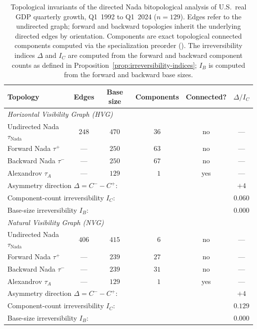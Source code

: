 \documentclass[11pt,a4paper]{article}
\theoremstyle{plain}
\theoremstyle{definition}
\newcommand{\taufwd}{\tau^{+}}
\newcommand{\taubwd}{\tau^{-}}
\begin{document}
\begin{table}[h]
\centering
\small
\begin{tabular}{l c c c c c}
\hline
\textbf{Topology} & \textbf{Edges} & \textbf{Base size} &
  \textbf{Components} & \textbf{Connected?} & $\Delta / I_{C}$ \\
\hline
\multicolumn{6}{l}{\emph{Horizontal Visibility Graph (HVG)}} \\
Undirected Nada $\tau_{\text{Nada}}$ & $248$ & $470$ & $36$ & no & --- \\
Forward Nada $\taufwd$               & ---  & $250$ & $63$ & no & --- \\
Backward Nada $\taubwd$              & ---  & $250$ & $67$ & no & --- \\
Alexandrov $\tau_A$                  & ---  & $129$ & $\phantom{0}1$ & yes & --- \\[0.4ex]
\multicolumn{5}{l}{\hspace{1em}Asymmetry direction $\Delta = C^{-} - C^{+}$:}
  & $+4$ \\
\multicolumn{5}{l}{\hspace{1em}Component-count irreversibility $I_{C}$:}
  & $0.060$ \\
\multicolumn{5}{l}{\hspace{1em}Base-size irreversibility $I_{B}$:}
  & $0.000$ \\
\hline
\multicolumn{6}{l}{\emph{Natural Visibility Graph (NVG)}} \\
Undirected Nada $\tau_{\text{Nada}}$ & $406$ & $415$ & $\phantom{0}6$ & no & --- \\
Forward Nada $\taufwd$               & ---  & $239$ & $27$ & no & --- \\
Backward Nada $\taubwd$              & ---  & $239$ & $31$ & no & --- \\
Alexandrov $\tau_A$                  & ---  & $129$ & $\phantom{0}1$ & yes & --- \\[0.4ex]
\multicolumn{5}{l}{\hspace{1em}Asymmetry direction $\Delta = C^{-} - C^{+}$:}
  & $+4$ \\
\multicolumn{5}{l}{\hspace{1em}Component-count irreversibility $I_{C}$:}
  & $0.129$ \\
\multicolumn{5}{l}{\hspace{1em}Base-size irreversibility $I_{B}$:}
  & $0.000$ \\
\hline
\end{tabular}
\caption{Topological invariants of the directed Nada bitopological
analysis of U.S.\ real GDP quarterly growth, Q1~1992 to Q1~2024
($n = 129$). Edges refer to the undirected graph; forward and backward
topologies inherit the underlying directed edges by orientation.
Components are exact topological connected components computed via the
specialization preorder (). The
irreversibility indices $\Delta$ and $I_C$ are computed from the forward
and backward component counts as defined in
Proposition~\ref{prop:irreversibility-indices}; $I_B$ is computed from
the forward and backward base sizes.\label{tab:gdp-results}}
\end{table}
\end{document}
